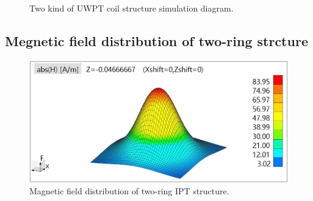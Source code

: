 \begin{figure}[!t]
    \caption{Two kind of UWPT coil structure simulation diagram.}
    \label{fig: two strcture}
\end{figure}

\subsection{Megnetic field distribution of two-ring strcture}

\begin{figure}[!b]
    \centering
    \includegraphics[width=0.9\linewidth]{images/4_two_ring_near_field_distribution.JPG}
    \caption{Magnetic field distribution of two-ring IPT structure.}
    \label{fig: magnetic distribution of two ring}
\end{figure}

